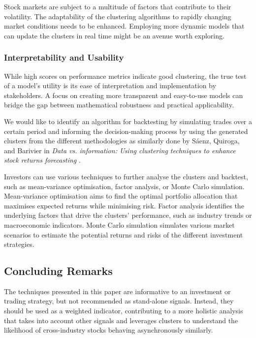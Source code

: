 \documentclass[11pt]{article}
\begin{document}
Stock markets are subject to a multitude of factors that contribute to their volatility. The adaptability of the clustering algorithms to rapidly changing market conditions needs to be enhanced. Employing more dynamic models that can update the clusters in real time might be an avenue worth exploring.

\subsubsection{Interpretability and Usability}

While high scores on performance metrics indicate good clustering, the true test of a model's utility is its ease of interpretation and implementation by stakeholders. A focus on creating more transparent and easy-to-use models can bridge the gap between mathematical robustness and practical applicability.

We would like to identify an algorithm for backtesting by simulating trades over a certain period and informing the decision-making process by using the generated clusters from the different methodologies as similarly done by Sáenz, Quiroga, and Barivier in \textit{Data vs. information: Using clustering techniques to enhance stock returns forecasting} \cite{dataVsInformation}. 

Investors can use various techniques to further analyse the clusters and backtest, such as mean-variance optimisation, factor analysis, or Monte Carlo simulation. Mean-variance optimisation aims to find the optimal portfolio allocation that maximises expected returns while minimising risk. Factor analysis identifies the underlying factors that drive the clusters' performance, such as industry trends or macroeconomic indicators. Monte Carlo simulation simulates various market scenarios to estimate the potential returns and risks of the different investment strategies.



\subsection{Concluding Remarks}

The techniques presented in this paper are informative to an investment or trading strategy, but not recommended as stand-alone signals. Instead, they should be used as a weighted indicator, contributing to a more holistic analysis that takes into account other signals and leverages clusters to understand the likelihood of cross-industry stocks behaving asynchronously similarly.
\end{document}
